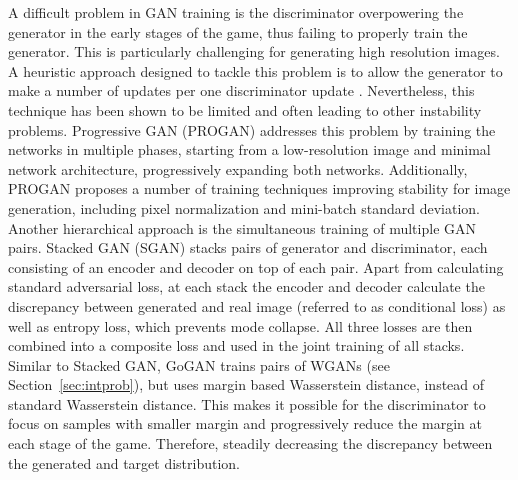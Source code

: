 A difficult problem in GAN training is the discriminator overpowering the generator in the early stages of the game, thus failing to properly train the generator. This is particularly challenging for generating high resolution images. A heuristic approach designed to tackle this problem is to allow the generator to make a number of updates per one discriminator update . Nevertheless, this technique has been shown to be limited and often leading to other instability problems. Progressive GAN (PROGAN)  addresses this problem by training the networks in multiple phases, starting from a low-resolution image and minimal network architecture, progressively expanding both networks. Additionally, PROGAN proposes a number of training techniques improving stability for image generation, including pixel normalization and mini-batch standard deviation.
Another hierarchical approach is the simultaneous training of multiple GAN pairs. Stacked GAN (SGAN)  stacks pairs of generator and discriminator, each consisting of an encoder and decoder on top of each pair. Apart from calculating standard adversarial loss, at each stack the encoder and decoder calculate the discrepancy between generated and real image (referred to as conditional loss) as well as entropy loss, which prevents mode collapse. All three losses are then combined into a composite loss and used in the joint training of all stacks. Similar to Stacked GAN, GoGAN  trains pairs of WGANs  (see Section~\ref{sec:intprob}), but uses margin based Wasserstein distance, instead of standard Wasserstein distance. This makes it possible for the discriminator to focus on samples with smaller margin and progressively reduce the margin at each stage of the game. Therefore, steadily decreasing the discrepancy between the generated and target distribution.

